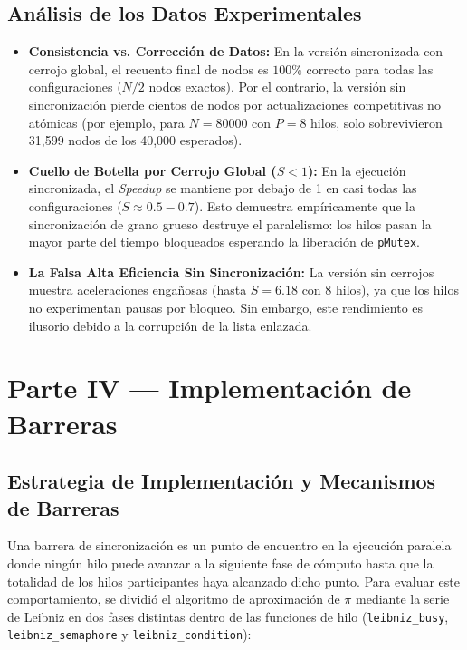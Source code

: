 \documentclass[11pt,a4paper]{article}
\begin{document}
\subsection{Análisis de los Datos Experimentales}
\begin{itemize}
    \item \textbf{Consistencia vs. Corrección de Datos:} En la versión sincronizada con cerrojo global, el recuento final de nodos es $100\%$ correcto para todas las configuraciones ($N/2$ nodos exactos). Por el contrario, la versión sin sincronización pierde cientos de nodos por actualizaciones competitivas no atómicas (por ejemplo, para $N = 80000$ con $P = 8$ hilos, solo sobrevivieron 31,599 nodos de los 40,000 esperados).
    \item \textbf{Cuello de Botella por Cerrojo Global ($S < 1$):} En la ejecución sincronizada, el \textit{Speedup} se mantiene por debajo de 1 en casi todas las configuraciones ($S \approx 0.5 - 0.7$). Esto demuestra empíricamente que la sincronización de grano grueso destruye el paralelismo: los hilos pasan la mayor parte del tiempo bloqueados esperando la liberación de \texttt{pMutex}.
    \item \textbf{La Falsa Alta Eficiencia Sin Sincronización:} La versión sin cerrojos muestra aceleraciones engañosas (hasta $S = 6.18$ con 8 hilos), ya que los hilos no experimentan pausas por bloqueo. Sin embargo, este rendimiento es ilusorio debido a la corrupción de la lista enlazada.
\end{itemize}





\section{Parte IV — Implementación de Barreras}

\subsection{Estrategia de Implementación y Mecanismos de Barreras}
Una barrera de sincronización es un punto de encuentro en la ejecución paralela donde ningún hilo puede avanzar a la siguiente fase de cómputo hasta que la totalidad de los hilos participantes haya alcanzado dicho punto. Para evaluar este comportamiento, se dividió el algoritmo de aproximación de \texorpdfstring{$\pi$}{pi} mediante la serie de Leibniz en dos fases distintas dentro de las funciones de hilo (\texttt{leibniz\_busy}, \texttt{leibniz\_semaphore} y \texttt{leibniz\_condition}):
\end{document}
